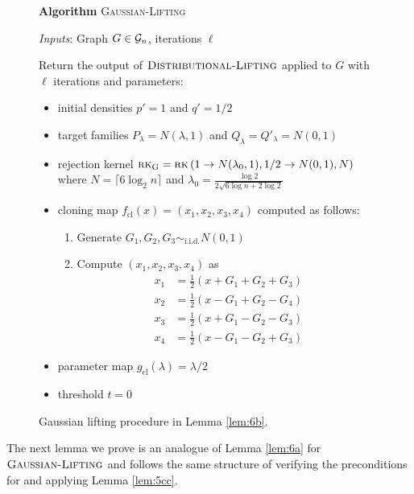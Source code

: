 \begin{figure}[t!]
\begin{algbox}
\textbf{Algorithm} \textsc{Gaussian-Lifting}

\vspace{2mm}

\textit{Inputs}: Graph $G \in \mathcal{G}_n$, iterations $\ell$

\vspace{2mm}

Return the output of $\textsc{Distributional-Lifting}$ applied to $G$ with $\ell$ iterations and parameters:
\begin{itemize}
\item initial densities $p' = 1$ and $q' = 1/2$
\item target families $P_{\lambda} = N(\lambda, 1)$ and $Q_{\lambda} = Q'_\lambda = N(0, 1)$
\item rejection kernel $\textsc{rk}_{\text{G}} = \textsc{rk}\left( 1 \to N(\lambda_0, 1), 1/2 \to N(0, 1), N \right)$ where $N = \lceil 6 \log_2 n \rceil$ and $\lambda_0 = \frac{\log 2}{2 \sqrt{6 \log n + 2\log 2}}$
\item cloning map $f_{\text{cl}}(x) = (x_1, x_2, x_3, x_4)$ computed as follows:
\begin{enumerate}
\item Generate $G_1, G_2, G_3 \sim_{\text{i.i.d.}} N(0, 1)$
\item Compute $(x_1, x_2, x_3, x_4)$ as
\begin{align*}
x_1 &= \frac{1}{2} \left( x + G_1 + G_2 + G_3 \right) \\
x_2 &= \frac{1}{2} \left( x - G_1 + G_2 - G_4 \right) \\
x_3 &= \frac{1}{2} \left( x + G_1 - G_2 - G_3 \right) \\
x_4 &= \frac{1}{2} \left( x - G_1 - G_2 + G_3 \right)
\end{align*}
\end{enumerate}
\item parameter map $g_{\text{cl}}(\lambda) = \lambda/2$
\item threshold $t = 0$
\end{itemize}
\vspace{1mm}
\end{algbox}
\caption{Gaussian lifting procedure in Lemma \ref{lem:6b}.}
\label{fig:gaussian}
\end{figure}

The next lemma we prove is an analogue of Lemma \ref{lem:6a} for $\textsc{Gaussian-Lifting}$ and follows the same structure of verifying the preconditions for and applying Lemma \ref{lem:5cc}.

